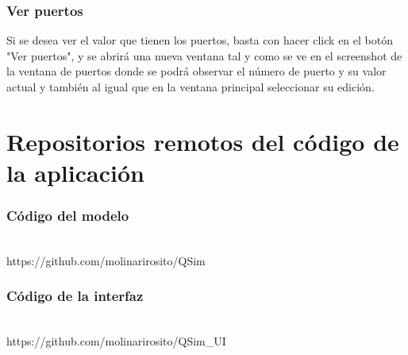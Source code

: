 \subsubsection{Ver puertos}
Si se desea ver el valor que tienen los puertos, basta con hacer click en el botón "Ver puertos", y se abrirá una nueva ventana tal y como se ve en el screenshot de la ventana de puertos donde se podrá observar el número de puerto y su valor actual y también al igual que en la ventana principal seleccionar su edición.
\\


\section{Repositorios remotos del código de la aplicación}

\subsubsection{Código del modelo}\\
https://github.com/molinarirosito/QSim

\subsubsection{Código de la interfaz}\\
https://github.com/molinarirosito/QSim_UI